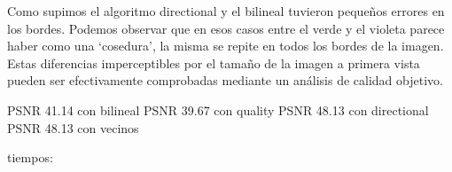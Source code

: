 Como supimos el algoritmo directional y el bilineal tuvieron pequeños errores en los bordes. Podemos observar que en esos casos entre el verde y el violeta parece haber como una `cosedura', la misma se repite en todos los bordes de la imagen. Estas diferencias imperceptibles por el tamaño de la imagen a primera vista pueden ser efectivamente comprobadas mediante un análisis de calidad objetivo. 

PSNR 41.14 con bilineal
PSNR 39.67 con quality
PSNR 48.13 con directional
PSNR 48.13 con vecinos

tiempos:




